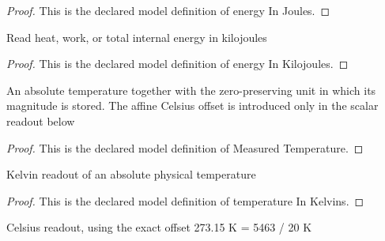 \begin{proof}
  This is the declared model definition of energy In Joules.
\end{proof}
\begin{definition}
  \label{def:physics:phyx-mini-0451:phyxminiproblems-problemphyxmini0451-energyinkilojoules}
  Read heat, work, or total internal energy in kilojoules
\end{definition}
\begin{proof}
  This is the declared model definition of energy In Kilojoules.
\end{proof}
\begin{definition}
  \label{def:physics:phyx-mini-0451:phyxminiproblems-problemphyxmini0451-measuredtemperature}
  An absolute temperature together with the zero-preserving unit in which its magnitude is stored. The affine Celsius offset is introduced only in the scalar readout below
\end{definition}
\begin{proof}
  This is the declared model definition of Measured Temperature.
\end{proof}
\begin{definition}
  \label{def:physics:phyx-mini-0451:phyxminiproblems-problemphyxmini0451-temperatureinkelvins}
  Kelvin readout of an absolute physical temperature
\end{definition}
\begin{proof}
  This is the declared model definition of temperature In Kelvins.
\end{proof}
\begin{definition}
  \label{def:physics:phyx-mini-0451:phyxminiproblems-problemphyxmini0451-temperatureindegreescelsius}
  Celsius readout, using the exact offset 273.15 K = 5463 / 20 K
\end{definition}
